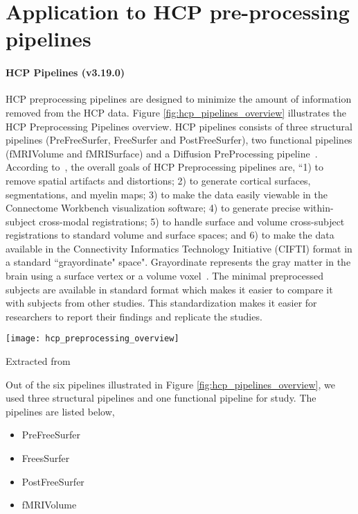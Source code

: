 \chapter{Application to HCP pre-processing pipelines}

\subsubsection{HCP Pipelines (v3.19.0)}
HCP preprocessing pipelines are designed to minimize the amount of information removed from the HCP data. Figure \ref{fig:hcp_pipelines_overview} illustrates the HCP Preprocessing Pipelines overview. HCP pipelines consists of three structural pipelines (PreFreeSurfer, FreeSurfer and PostFreeSurfer), two functional pipelines (fMRIVolume and fMRISurface) and a Diffusion PreProcessing pipeline~\cite{Gla13}. According to~\cite{Gla13}, the overall goals of HCP Preprocessing pipelines are, ``1) to remove spatial artifacts and distortions; 2) to generate cortical surfaces, segmentations, and myelin maps; 3) to make the data easily viewable in the Connectome Workbench visualization software; 4) to generate precise within-subject cross-modal registrations; 5) to handle surface and volume cross-subject registrations to standard volume and surface spaces; and 6) to make the data available in the Connectivity Informatics Technology Initiative (CIFTI) format in a standard ``grayordinate" space". Grayordinate represents the gray matter in the brain using a surface vertex or a volume voxel~\cite{Grayordinate}. The minimal preprocessed subjects are available in standard format which makes it easier to compare it with subjects from other studies. This standardization makes it easier for researchers to report their findings and replicate the studies.

\begin{center}
   \texttt{[image: hcp\_preprocessing\_overview]}
   \label{fig:hcp_pipelines_overview}
   \caption*{Extracted from \cite{Gla13}}
\end{center}

Out of the six pipelines illustrated in Figure \ref{fig:hcp_pipelines_overview}, we used three structural pipelines and one functional pipeline for study. The pipelines are listed below, 
\begin{itemize}
  \item PreFreeSurfer
  \item FreesSurfer
  \item PostFreeSurfer
  \item fMRIVolume
\end{itemize}

